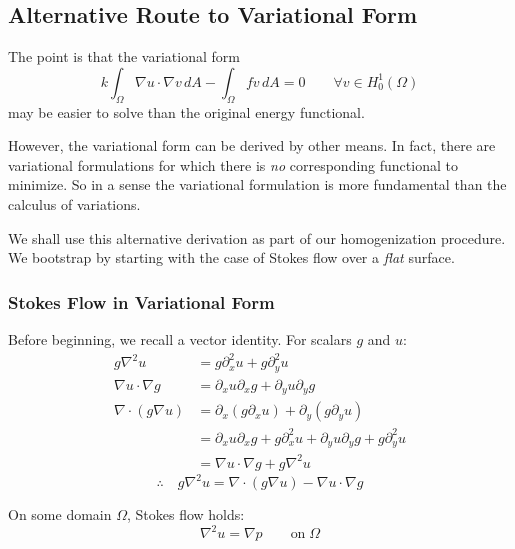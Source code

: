 \documentclass[a4paper]{report}
\begin{document}
\subsection*{Alternative Route to Variational Form}

The point is that the variational form
\begin{equation}
k \int_{\Omega} \nabla u \cdot \nabla v \,dA  - \int_{\Omega} f v \,dA = 0
\qquad
\forall v \in H_0^1(\Omega)
\end{equation}
may be easier to solve than the original energy functional.

However, the variational form can be derived by other means.  In fact, there are variational formulations for which there is \emph{no} corresponding functional to minimize.  So in a sense the variational formulation is more fundamental than the calculus of variations.

We shall use this alternative derivation as part of our homogenization procedure.  We bootstrap by starting with the case of Stokes flow over a \emph{flat} surface.

\subsubsection*{Stokes Flow in Variational Form}

Before beginning, we recall a vector identity.  For scalars $g$ and $u$:
\begin{align*}
g \nabla^2 u & = g \partial_x^2 u + g \partial_y^2 u \\
\nabla u \cdot \nabla g & = \partial_x u \partial_x g + \partial_y u \partial_y g \\
\nabla \cdot (g \nabla u) & = \partial_x (g \partial_x u) + \partial_y (g \partial_y u) \\
  & = \partial_x u \partial_x g + g \partial_x^2 u + \partial_y u \partial_y g + g \partial_y^2 u \\ 
  & = \nabla u \cdot \nabla g + g \nabla^2 u 
\end{align*}
\begin{equation*}
\therefore \quad g \nabla^2 u = \nabla \cdot (g \nabla u) - \nabla u \cdot \nabla g
\end{equation*}

\vspace{2em}

On some domain $\Omega$, Stokes flow holds:
\begin{equation}
\nabla^2 u = \nabla p \qquad \text{on} \; \Omega
\end{equation}
\end{document}
